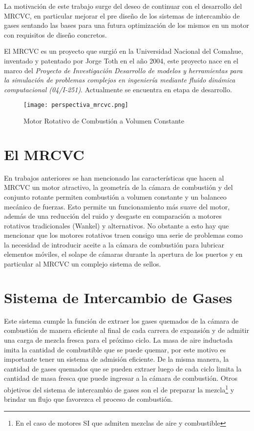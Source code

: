 La motivación de este trabajo surge del deseo de continuar con el desarrollo
del MRCVC, en particular mejorar el pre diseño de los sistemas de intercambio
de gases sentando las bases para una futura optimización de los mismos en un
motor con requisitos de diseño concretos.


El MRCVC es un proyecto que surgió en la Universidad Nacional del Comahue,
inventado y patentado por Jorge Toth\cite{toth} en el año 2004, este proyecto
nace en el marco del \emph{Proyecto de Investigación Desarrollo de modelos y
herramientas para la simulación de problemas complejos en ingeniería mediante
fluido dinámica computacional (04/I-251)}. Actualmente se encuentra en etapa de
desarrollo.

\begin{figure}
    \centering
    \texttt{[image: perspectiva\_mrcvc.png]}
    \caption{Motor Rotativo de Combustión a Volumen Constante}
    \label{fig:mrcvc}
\end{figure}


\section{El MRCVC}
%
En trabajos anteriores\cite{lopez16, lopez13, roldan} se han mencionado las
características que hacen al MRCVC un motor atractivo, la geometría de la cámara
de combustión y del conjunto rotante permiten  combustión a volumen constante y
un balanceo mecánico de fuerzas.
%
Esto permite un funcionamiento más suave del motor, además de una reducción del
ruido y desgaste en comparación a motores rotativos tradicionales (Wankel) y
alternativos.
%
No obstante a esto hay que mencionar que los motores rotativos traen consigo
una serie de problemas como la necesidad de introducir aceite a la cámara de
combustión para lubricar elementos móviles, el solape de cámaras durante la
apertura de los puertos y en particular al MRCVC un complejo sistema de
sellos\cite{roldan}.


\section{Sistema de Intercambio de Gases}
%
Este sistema cumple la función de extraer los gases quemados de la cámara de
combustión de manera eficiente al final de cada carrera de expansión y de
admitir una carga de mezcla fresca para el próximo ciclo.
%
La masa de aire inductada imita la cantidad de combustible que se puede quemar,
por este motivo es importante tener un sistema de admisión eficiente.
%
De la misma manera, la cantidad de gases quemados que se pueden extraer luego
de cada ciclo limita la cantidad de masa fresca que puede ingresar a la cámara
de combustión.
%
Otros objetivos del sistema de intercambio de gases son el de preparar la
mezcla\footnote{En el caso de motores SI que admiten mezclas de aire y
combustible} y brindar un flujo que favorezca el proceso de combustión.

